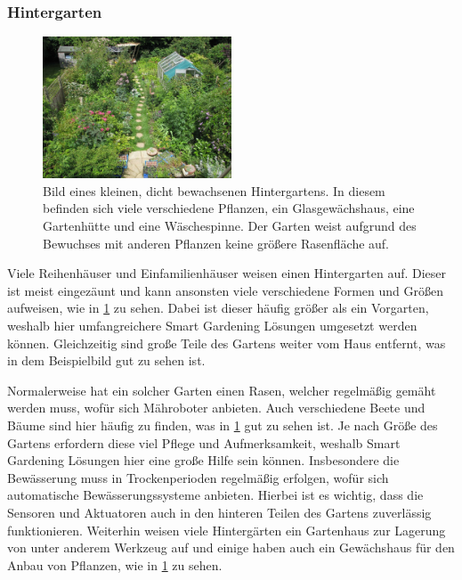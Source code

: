 \subsubsection{Hintergarten}
\begin{figure}[!htb]
	\centering
	\includegraphics[width=0.5\textwidth]{images/Hintergarten.jpg}
	\caption[Bild eines kleinen, dicht bewachsenen Hintergartens.]{
		Bild eines kleinen, dicht bewachsenen Hintergartens.
		In diesem befinden sich viele verschiedene Pflanzen, ein Glasgewächshaus, eine Gartenhütte und eine Wäschespinne.
		Der Garten weist aufgrund des Bewuchses mit anderen Pflanzen keine größere Rasenfläche auf.\footnotemark
	}
	\label{pic:hintergarten}
\end{figure}

Viele Reihenhäuser und Einfamilienhäuser weisen einen Hintergarten auf.
Dieser ist meist eingezäunt und kann ansonsten viele verschiedene Formen und Größen aufweisen, wie in \cref{pic:hintergarten} zu sehen.
Dabei ist dieser häufig größer als ein Vorgarten, weshalb hier umfangreichere Smart Gardening Lösungen umgesetzt werden können.
Gleichzeitig sind große Teile des Gartens weiter vom Haus entfernt, was in dem Beispielbild gut zu sehen ist.

Normalerweise hat ein solcher Garten einen Rasen, welcher regelmäßig gemäht werden muss, wofür sich Mähroboter anbieten.
Auch verschiedene Beete und Bäume sind hier häufig zu finden, was in \cref{pic:hintergarten} gut zu sehen ist.
Je nach Größe des Gartens erfordern diese viel Pflege und Aufmerksamkeit, weshalb Smart Gardening Lösungen hier eine große Hilfe sein können.
Insbesondere die Bewässerung muss in Trockenperioden regelmäßig erfolgen, wofür sich automatische Bewässerungssysteme anbieten.
Hierbei ist es wichtig, dass die Sensoren und Aktuatoren auch in den hinteren Teilen des Gartens zuverlässig funktionieren.
Weiterhin weisen viele Hintergärten ein Gartenhaus zur Lagerung von unter anderem Werkzeug auf und einige haben auch ein Gewächshaus für den Anbau von Pflanzen, wie in \cref{pic:hintergarten} zu sehen.

